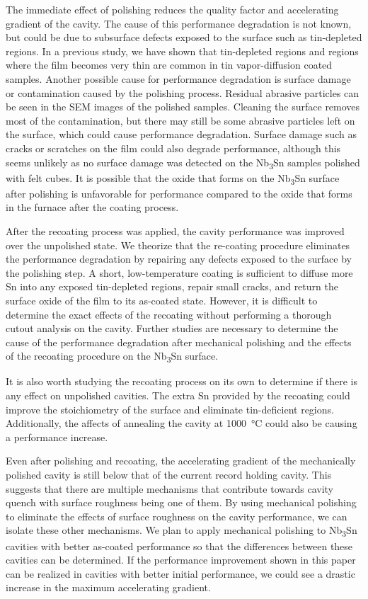 \documentclass[reprint,amsmath,amssymb,aps]{revtex4-2}%
\begin{document}
The immediate effect of polishing reduces the quality factor and accelerating gradient of the cavity. The cause of this performance degradation is not known, but could be due to subsurface defects exposed to the surface such as tin-depleted regions\cite{lee2018atomic}. In a previous study, we have shown that tin-depleted regions and regions where the film becomes very thin are common in tin vapor-diffusion coated samples\cite{10073616}. Another possible cause for performance degradation is surface damage or contamination caused by the polishing process. Residual abrasive particles can be seen in the SEM images of the polished samples. Cleaning the surface removes most of the contamination, but there may still be some abrasive particles left on the surface, which could cause performance degradation. Surface damage such as cracks or scratches on the film could also degrade performance, although this seems unlikely as no surface damage was detected on the Nb\textsubscript{3}Sn samples polished with felt cubes. It is possible that the oxide that forms on the Nb\textsubscript{3}Sn surface after polishing is unfavorable for performance compared to the oxide that forms in the furnace after the coating process.

After the recoating process was applied, the cavity performance was improved over the unpolished state. We theorize that the re-coating procedure eliminates the performance degradation by repairing any defects exposed to the surface by the polishing step. A short, low-temperature coating is sufficient to diffuse more Sn into any exposed tin-depleted regions, repair small cracks, and return the surface oxide of the film to its as-coated state. However, it is difficult to determine the exact effects of the recoating without performing a thorough cutout analysis on the cavity. Further studies are necessary to determine the cause of the performance degradation after mechanical polishing and the effects of the recoating procedure on the Nb\textsubscript{3}Sn surface.

It is also worth studying the recoating process on its own to determine if there is any effect on unpolished cavities. The extra Sn provided by the recoating could improve the stoichiometry of the surface and eliminate tin-deficient regions. Additionally, the affects of annealing the cavity at 1000~\si{\celsius} could also be causing a performance increase.

Even after polishing and recoating, the accelerating gradient of the mechanically polished cavity is still below that of the current record holding cavity.\cite{posen2021advances} This suggests that there are multiple mechanisms that contribute towards cavity quench with surface roughness being one of them. By using mechanical polishing to eliminate the effects of surface roughness on the cavity performance, we can isolate these other mechanisms. We plan to apply mechanical polishing to Nb\textsubscript{3}Sn cavities with better as-coated performance so that the differences between these cavities can be determined. If the performance improvement shown in this paper can be realized in cavities with better initial performance, we could see a drastic increase in the maximum accelerating gradient.
\end{document}
